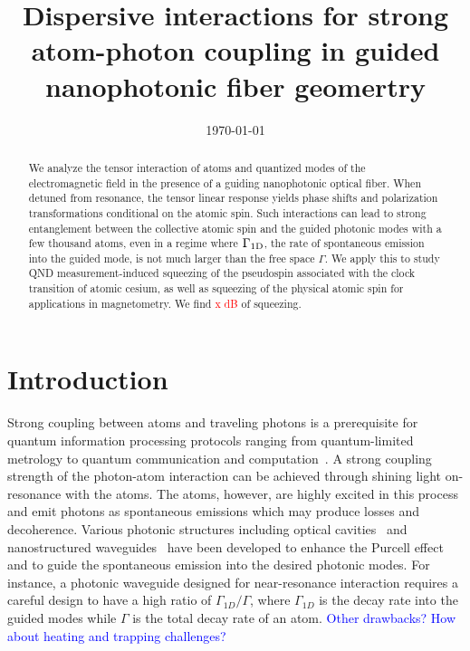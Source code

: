 \documentclass[preprint,aps,pra,onecolumn]{revtex4-1} %
\begin{document}
\title{Dispersive interactions for strong atom-photon coupling in guided nanophotonic fiber geomertry}
\author{}
\date{\today}


\begin{abstract}
We analyze the tensor interaction of atoms and quantized modes of the electromagnetic field in the 
presence of a guiding nanophotonic optical fiber.  When detuned from resonance, the tensor linear 
response yields phase shifts and polarization transformations conditional on the atomic spin.  Such 
interactions can lead to strong entanglement between the collective atomic spin and the guided 
photonic modes with a few thousand atoms, even in a regime where $\Gamma_{\rm 1D}$, the rate of 
spontaneous emission into the guided mode, is not much larger than the free space $\Gamma$.  We 
apply this to study QND measurement-induced squeezing  of the pseudospin associated with the clock 
transition of atomic cesium, as well as squeezing of the physical atomic spin for applications in 
magnetometry.  We find \textcolor{red}{x dB} of squeezing.
\end{abstract}

\maketitle

\section{Introduction}
\bigskip


Strong coupling between atoms and traveling photons is a prerequisite for quantum information processing protocols ranging from quantum-limited metrology to quantum communication and computation~\cite{Kuzmich2003,Peyronel2012}. A strong coupling strength of the photon-atom interaction can be achieved through shining light on-resonance with the atoms. The atoms, however, are highly excited in this process and emit photons as spontaneous emissions which may produce losses and decoherence. Various photonic structures including optical cavities~\cite{Alton2011,Thompson2013} and nanostructured waveguides~\cite{Goban2014,Lee2013} have been developed to enhance the Purcell effect and to guide the spontaneous emission into the desired photonic modes. For instance, a photonic waveguide designed for near-resonance interaction requires a careful design to have a high ratio of $\Gamma_{1D}/\Gamma$, where $\Gamma_{1D}$ is the decay rate into the guided modes while $\Gamma$ is the total decay rate of an atom. \textcolor{blue}{Other drawbacks? How about heating and trapping challenges?}
\end{document}
